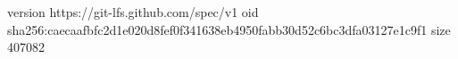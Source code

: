 version https://git-lfs.github.com/spec/v1
oid sha256:caecaafbfc2d1e020d8fef0f341638eb4950fabb30d52c6bc3dfa03127e1c9f1
size 407082
